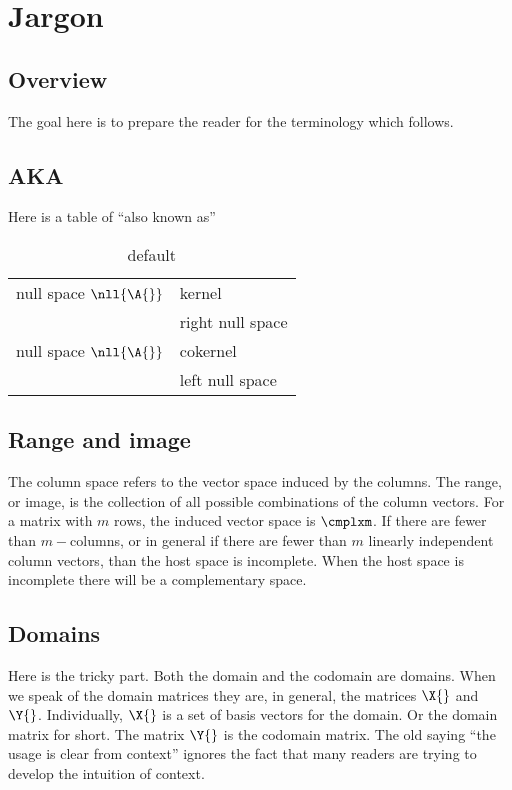 \section{Jargon}

\subsection{Overview}
The goal here is to prepare the reader for the terminology which follows.

\subsection{AKA}
Here is a table of ``also known as''
\begin{table}[htdp]
\caption{default}
\begin{center}
\begin{tabular}{ll}
null space $\nll{\A{}}$ & kernel\\
 & right null space\\
null space $\nll{\A{}}$ & cokernel\\
 & left null space\\
\end{tabular}
\end{center}
\label{default}
\end{table}%


\subsection{Range and image}
The column space refers to the vector space induced by the columns. The range, or image, is the collection of all possible combinations of the column vectors. For a matrix with $m$ rows, the induced vector space is $\cmplxm$. If there are fewer than $m-$columns, or in general if there are fewer than $m$ linearly independent column vectors, than the host space is incomplete. When the host space is incomplete there will be a complementary space.


\subsection{Domains}
Here is the tricky part. Both the domain and the codomain are domains. When we speak of the domain matrices they are, in general, the matrices $\X{}$ and $\Y{}$. Individually, $\X{}$ is a set of basis vectors for the domain. Or the domain matrix for short. The matrix $\Y{}$ is the codomain matrix. The old saying ``the usage is clear from context'' ignores the fact that many readers are trying to develop the intuition of context.

